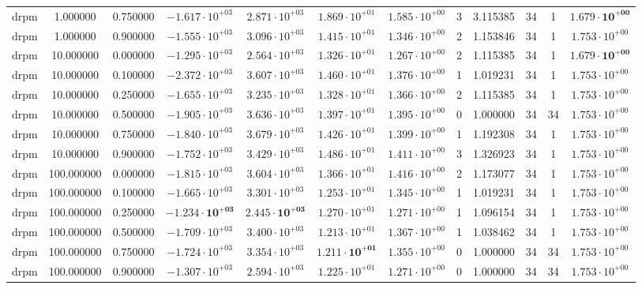 \begin{table}
\begin{tabular}{cccccccccccc}
drpm & 1.000000 & 0.750000 & $-1.617 \cdot 10^{+03}$ & $2.871 \cdot 10^{+03}$ & $1.869 \cdot 10^{+01}$ & $1.585 \cdot 10^{+00}$ & 3 & 3.115385 & 34 & 1 & $\mathbf{1.679 \cdot 10^{+00}}$ \\
drpm & 1.000000 & 0.900000 & $-1.555 \cdot 10^{+03}$ & $3.096 \cdot 10^{+03}$ & $1.415 \cdot 10^{+01}$ & $1.346 \cdot 10^{+00}$ & 2 & 1.153846 & 34 & 1 & $1.753 \cdot 10^{+00}$ \\
drpm & 10.000000 & 0.000000 & $-1.295 \cdot 10^{+03}$ & $2.564 \cdot 10^{+03}$ & $1.326 \cdot 10^{+01}$ & $1.267 \cdot 10^{+00}$ & 2 & 1.115385 & 34 & 1 & $\mathbf{1.679 \cdot 10^{+00}}$ \\
drpm & 10.000000 & 0.100000 & $-2.372 \cdot 10^{+03}$ & $3.607 \cdot 10^{+03}$ & $1.460 \cdot 10^{+01}$ & $1.376 \cdot 10^{+00}$ & 1 & 1.019231 & 34 & 1 & $1.753 \cdot 10^{+00}$ \\
drpm & 10.000000 & 0.250000 & $-1.655 \cdot 10^{+03}$ & $3.235 \cdot 10^{+03}$ & $1.328 \cdot 10^{+01}$ & $1.366 \cdot 10^{+00}$ & 2 & 1.115385 & 34 & 1 & $1.753 \cdot 10^{+00}$ \\
drpm & 10.000000 & 0.500000 & $-1.905 \cdot 10^{+03}$ & $3.636 \cdot 10^{+03}$ & $1.397 \cdot 10^{+01}$ & $1.395 \cdot 10^{+00}$ & 0 & 1.000000 & 34 & 34 & $1.753 \cdot 10^{+00}$ \\
drpm & 10.000000 & 0.750000 & $-1.840 \cdot 10^{+03}$ & $3.679 \cdot 10^{+03}$ & $1.426 \cdot 10^{+01}$ & $1.399 \cdot 10^{+00}$ & 1 & 1.192308 & 34 & 1 & $1.753 \cdot 10^{+00}$ \\
drpm & 10.000000 & 0.900000 & $-1.752 \cdot 10^{+03}$ & $3.429 \cdot 10^{+03}$ & $1.486 \cdot 10^{+01}$ & $1.411 \cdot 10^{+00}$ & 3 & 1.326923 & 34 & 1 & $1.753 \cdot 10^{+00}$ \\
drpm & 100.000000 & 0.000000 & $-1.815 \cdot 10^{+03}$ & $3.604 \cdot 10^{+03}$ & $1.366 \cdot 10^{+01}$ & $1.416 \cdot 10^{+00}$ & 2 & 1.173077 & 34 & 1 & $1.753 \cdot 10^{+00}$ \\
drpm & 100.000000 & 0.100000 & $-1.665 \cdot 10^{+03}$ & $3.301 \cdot 10^{+03}$ & $1.253 \cdot 10^{+01}$ & $1.345 \cdot 10^{+00}$ & 1 & 1.019231 & 34 & 1 & $1.753 \cdot 10^{+00}$ \\
drpm & 100.000000 & 0.250000 & $\mathbf{-1.234 \cdot 10^{+03}}$ & $\mathbf{2.445 \cdot 10^{+03}}$ & $1.270 \cdot 10^{+01}$ & $1.271 \cdot 10^{+00}$ & 1 & 1.096154 & 34 & 1 & $1.753 \cdot 10^{+00}$ \\
drpm & 100.000000 & 0.500000 & $-1.709 \cdot 10^{+03}$ & $3.400 \cdot 10^{+03}$ & $1.213 \cdot 10^{+01}$ & $1.367 \cdot 10^{+00}$ & 1 & 1.038462 & 34 & 1 & $1.753 \cdot 10^{+00}$ \\
drpm & 100.000000 & 0.750000 & $-1.724 \cdot 10^{+03}$ & $3.354 \cdot 10^{+03}$ & $\mathbf{1.211 \cdot 10^{+01}}$ & $1.355 \cdot 10^{+00}$ & 0 & 1.000000 & 34 & 34 & $1.753 \cdot 10^{+00}$ \\
drpm & 100.000000 & 0.900000 & $-1.307 \cdot 10^{+03}$ & $2.594 \cdot 10^{+03}$ & $1.225 \cdot 10^{+01}$ & $1.271 \cdot 10^{+00}$ & 0 & 1.000000 & 34 & 34 & $1.753 \cdot 10^{+00}$ \\
\bottomrule
\end{tabular}
\end{table}
